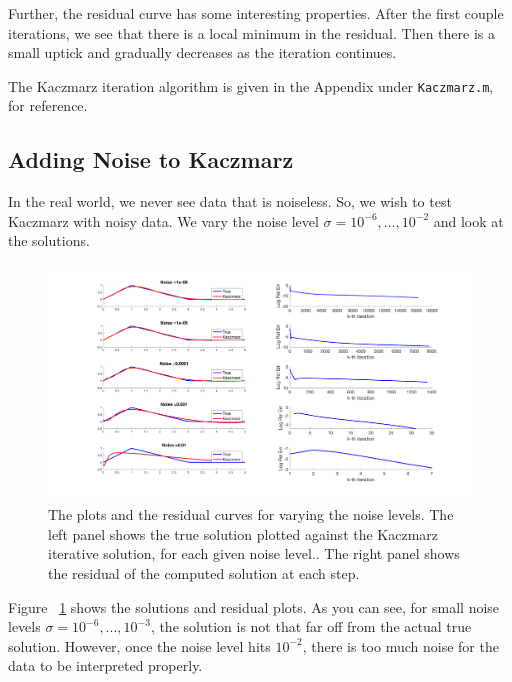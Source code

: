 \documentclass{article}
\begin{document}
Further, the residual curve has some interesting properties. After the first couple iterations, we see that there is a local minimum in the residual. Then there is a small uptick and gradually decreases as the iteration continues.

The Kaczmarz iteration algorithm is given in the Appendix under \texttt{Kaczmarz.m}, for reference.

\subsection{Adding Noise to Kaczmarz}

In the real world, we never see data that is noiseless. So, we wish to test Kaczmarz with noisy data. We vary the noise level $\sigma = 10^{-6},...,10^{-2}$ and look at the solutions.

\begin{figure}[H]
    \centerline{
    \includegraphics[height = 13 cm]{Iteration.png}
    }
    \caption{\label{fig:Iteration} The plots and the residual curves for varying the noise levels. The left panel shows the true solution plotted against the Kaczmarz iterative solution, for each given noise level.. The right panel shows the residual of the computed solution at each step.}
\end{figure}


Figure ~\ref{fig:Iteration} shows the solutions and residual plots. As you can see, for small noise levels $\sigma = 10^{-6},...,10^{-3}$, the solution is not that far off from the actual true solution. However, once the noise level hits $10^{-2}$, there is too much noise for the data to be interpreted properly. 
\end{document}
